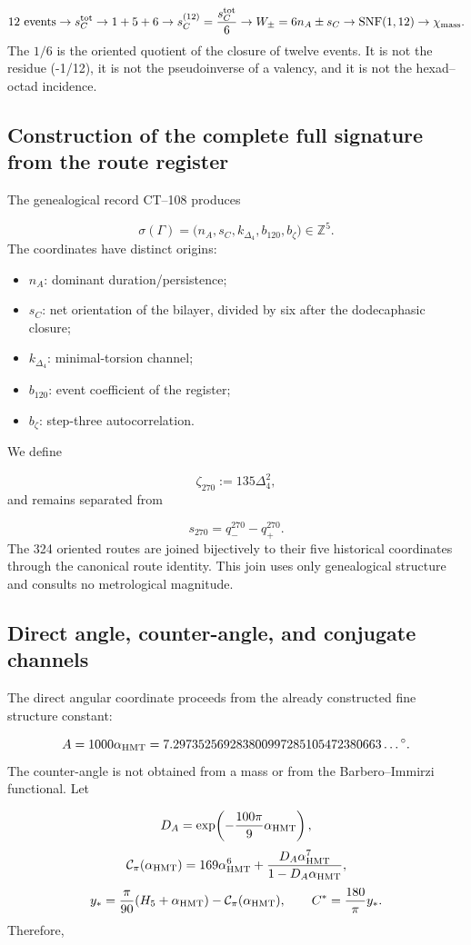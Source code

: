 \[
12\ \text{events}
\to s_C^{\rm tot}
\to 1+5+6
\to s_C^{(12)}=\frac{s_C^{\rm tot}}6
\to W_\pm=6n_A\pm s_C
\to\operatorname{SNF}(1,12)
\to\chi_{\rm mass}.
\]
The \(1/6\) is the oriented quotient of the closure of twelve events. It is not the residue (-1/12), it is not the pseudoinverse of a valency, and it is not the hexad--octad incidence.

\subsection{Construction of the complete full signature from the route register}
The genealogical record CT--108 produces

\[
 \sigma(\Gamma)
 =\bigl(n_A,s_C,k_{\Delta_4},b_{120},b_\zeta\bigr)\in\mathbb Z^5.
\]
The coordinates have distinct origins:

\begin{itemize}
\item \(n_A\): dominant duration/persistence;
\item \(s_C\): net orientation of the bilayer, divided by six after the
dodecaphasic closure;

\item \(k_{\Delta_4}\): minimal-torsion channel;
\item \(b_{120}\): event coefficient of the register;
\item \(b_\zeta\): step-three autocorrelation.
\end{itemize}
We define

\[
 \zeta_{270}:=135\Delta_4^2,
\]
and remains separated from

\[
 s_{270}=q_-^{270}-q_+^{270}.
\]
The 324 oriented routes are joined bijectively to their five historical coordinates through the canonical route identity. This join uses only genealogical structure and consults no metrological magnitude.

\subsection{Direct angle, counter-angle, and conjugate channels}
The direct angular coordinate proceeds from the already constructed fine structure constant:

\[
 A=1000\alpha_{\rm HMT}
 =7.297352569283800997285105472380663\ldots{}^\circ.
\]
The counter-angle is not obtained from a mass or from the Barbero--Immirzi functional. Let

\[
 D_A=\exp\!\left(-\frac{100\pi}{9}\alpha_{\rm HMT}\right),
\]
\[
 \mathcal C_\pi(\alpha_{\rm HMT})
 =169\alpha_{\rm HMT}^{6}
 +\frac{D_A\alpha_{\rm HMT}^{7}}
        {1-D_A\alpha_{\rm HMT}},
\]
\[
 y_*=\frac{\pi}{90}(H_5+\alpha_{\rm HMT})
      -\mathcal C_\pi(\alpha_{\rm HMT}),
 \qquad
 C^*=\frac{180}{\pi}y_*.
\]
Therefore,

